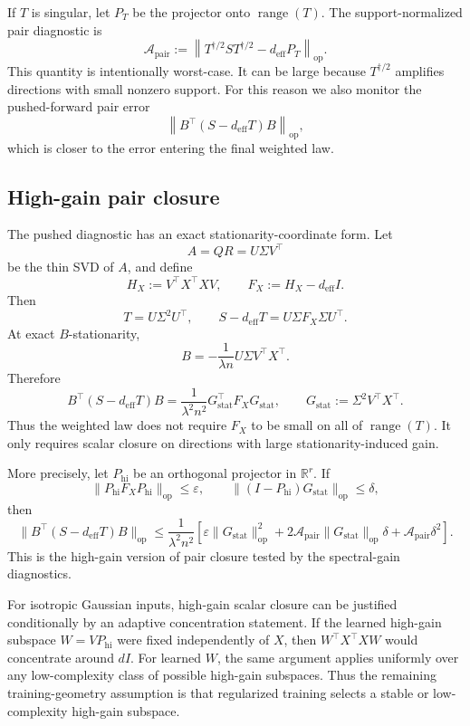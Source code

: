 If \(T\) is singular, let \(P_T\) be the projector onto \(\operatorname{range}(T)\).
The support-normalized pair diagnostic is
\[
\mathcal A_{\mathrm{pair}}
:=
\left\|
T^{\dagger/2}ST^{\dagger/2}
-
d_{\mathrm{eff}}P_T
\right\|_{\mathrm{op}}.
\]
This quantity is intentionally worst-case. It can be large because
\(T^{\dagger/2}\) amplifies directions with small nonzero support. For this
reason we also monitor the pushed-forward pair error
\[
\left\|B^\top(S-d_{\mathrm{eff}}T)B\right\|_{\mathrm{op}},
\]
which is closer to the error entering the final weighted law.

\subsection{High-gain pair closure}

The pushed diagnostic has an exact stationarity-coordinate form. Let
\[
A=QR=U\Sigma V^\top
\]
be the thin SVD of \(A\), and define
\[
H_X:=V^\top X^\top X V,
\qquad
F_X:=H_X-d_{\mathrm{eff}}I.
\]
Then
\[
T=U\Sigma^2U^\top,
\qquad
S-d_{\mathrm{eff}}T=U\Sigma F_X\Sigma U^\top.
\]
At exact \(B\)-stationarity,
\[
B=-\frac1{\lambda n}U\Sigma V^\top X^\top.
\]
Therefore
\[
B^\top(S-d_{\mathrm{eff}}T)B
=
\frac1{\lambda^2n^2}
G_{\mathrm{stat}}^\top F_XG_{\mathrm{stat}},
\qquad
G_{\mathrm{stat}}:=\Sigma^2V^\top X^\top.
\]
Thus the weighted law does not require \(F_X\) to be small on all of
\(\operatorname{range}(T)\). It only requires scalar closure on directions with
large stationarity-induced gain.

More precisely, let \(P_{\mathrm{hi}}\) be an orthogonal projector in
\(\mathbb R^r\). If
\[
\|P_{\mathrm{hi}}F_XP_{\mathrm{hi}}\|_{\mathrm{op}}\le \varepsilon,
\qquad
\|(I-P_{\mathrm{hi}})G_{\mathrm{stat}}\|_{\mathrm{op}}\le \delta,
\]
then
\[
\|B^\top(S-d_{\mathrm{eff}}T)B\|_{\mathrm{op}}
\le
\frac1{\lambda^2n^2}
\left[
\varepsilon\|G_{\mathrm{stat}}\|_{\mathrm{op}}^2
+
2\mathcal A_{\mathrm{pair}}\|G_{\mathrm{stat}}\|_{\mathrm{op}}\delta
+
\mathcal A_{\mathrm{pair}}\delta^2
\right].
\]
This is the high-gain version of pair closure tested by the spectral-gain
diagnostics.

For isotropic Gaussian inputs, high-gain scalar closure can be justified
conditionally by an adaptive concentration statement. If the learned high-gain
subspace \(W=VP_{\mathrm{hi}}\) were fixed independently of \(X\), then
\(W^\top X^\top XW\) would concentrate around \(dI\). For learned \(W\), the
same argument applies uniformly over any low-complexity class of possible
high-gain subspaces. Thus the remaining training-geometry assumption is that
regularized training selects a stable or low-complexity high-gain subspace.

